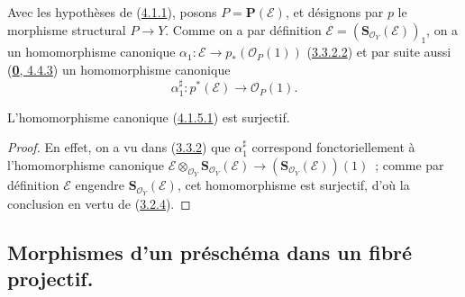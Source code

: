 \begin{env}[4.1.5]
\label{II.4.1.5-fr}
Avec les hypothèses de (\hyperref[II.4.1.1-fr]{4.1.1}), posons
$P=\mathbf{P}(\mathcal{E})$, et désignons par $p$ le morphisme structural
$P\to Y$. Comme on a par définition
$\mathcal{E}=(\mathbf{S}_{\mathcal{O}_Y}(\mathcal{E}))_1$, on a un
homomorphisme canonique
$\alpha_1:\mathcal{E}\to p_*(\mathcal{O}_P(1))$
(\hyperref[II.3.3.2.2-fr]{3.3.2.2}) et par suite aussi
(\hyperref[0.4.4.3-fr]{\textbf{0}, 4.4.3}) un homomorphisme canonique
\[
\label{II.4.1.5.1-fr}
  \alpha_1^\sharp:p^*(\mathcal{E})\longrightarrow\mathcal{O}_P(1).
\tag{4.1.5.1}
\]
\end{env}

\begin{proposition}[4.1.6]
\label{II.4.1.6-fr}
L'homomorphisme canonique \textup{(\hyperref[II.4.1.5.1-fr]{4.1.5.1})} est surjectif.
\end{proposition}

\begin{proof}
En effet, on a vu dans (\hyperref[II.3.3.2-fr]{3.3.2}) que
$\alpha_1^\sharp$ correspond fonctoriellement à l'homomorphisme canonique
$\mathcal{E}\otimes_{\mathcal{O}_Y}\mathbf{S}_{\mathcal{O}_Y}(\mathcal{E})\longrightarrow(\mathbf{S}_{\mathcal{O}_Y}(\mathcal{E}))(1)$~;
comme par définition $\mathcal{E}$ engendre
$\mathbf{S}_{\mathcal{O}_Y}(\mathcal{E})$, cet homomorphisme est surjectif,
d'où la conclusion en vertu de (\hyperref[II.3.2.4-fr]{3.2.4}).
\end{proof}

\subsection{Morphismes d'un préschéma dans un fibré projectif.}
\label{subsection:II.4.2-fr}


